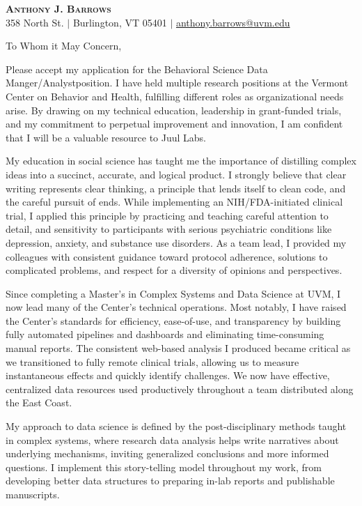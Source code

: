 \documentclass[letterpaper,11pt]{article}
\newcommand{\company}{Juul Labs}
\newcommand{\position}{Behavioral Science Data Manger/Analyst}
\begin{document}
\begin{center}
    \textbf{\Huge \scshape Anthony J. Barrows} \\ \vspace{3pt}
    \small 358 North St. $|$
    \small Burlington, VT 05401 $|$
    \href{mailto:ajbarrow@uvm.edu}{anthony.barrows@uvm.edu}
\end{center}
\vspace{5mm}
	
	To Whom it May Concern,
	\vspace{3mm}
	
	Please accept my application for the \position \space position. I have held multiple research positions at the Vermont Center on Behavior and Health, fulfilling different roles as organizational needs arise. By drawing on my technical education, leadership in grant-funded trials, and my commitment to perpetual improvement and innovation, I am confident that I will be a valuable resource to \company.
	
	
	My education in social science has taught me the importance of distilling complex ideas into a succinct, accurate, and logical product. I strongly believe that clear writing represents clear thinking, a principle that lends itself to clean code, and the careful pursuit of ends. While implementing an NIH/FDA-initiated clinical trial, I applied this principle by practicing and teaching careful attention to detail, and sensitivity to participants with serious psychiatric conditions like depression, anxiety, and substance use disorders. As a team lead, I provided my colleagues with consistent guidance toward protocol adherence, solutions to complicated problems, and respect for a diversity of opinions and perspectives.
	
	
	Since completing a Master's in Complex Systems and Data Science at UVM, I now lead many of the Center's technical operations. Most notably, I have raised the Center’s standards for efficiency, ease-of-use, and transparency by building fully automated pipelines and dashboards and eliminating time-consuming manual reports. The consistent web-based analysis I produced became critical as we transitioned to fully remote clinical trials, allowing us to measure instantaneous effects and quickly identify challenges. We now have effective, centralized data resources used productively throughout a team distributed along the East Coast. 
	
	My approach to data science is defined by the post-disciplinary methods taught in complex systems, where research data analysis helps write narratives about underlying mechanisms, inviting generalized conclusions and more informed questions. I implement this story-telling model throughout my work, from developing better data structures to preparing in-lab reports and publishable manuscripts.
	
\end{document}
